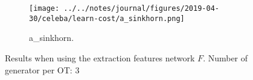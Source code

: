 \begin{figure}[!htbp]
   \centering
\begin{subfigure}[t]{0.98\textwidth}
   \texttt{[image: ../../notes/journal/figures/2019-04-30/celeba/learn-cost/a\_sinkhorn.png]}
   \caption{a_sinkhorn.}
   \label{fig:.._.._notes_journal_figures_2019-04-30_celeba_learn-cost-a}
\end{subfigure}
   \caption{Results when using the extraction features network $F$. Number of generator per OT: 3}
   \label{fig:.._.._notes_journal_figures_2019-04-30_celeba_learn-cost}
\end{figure}